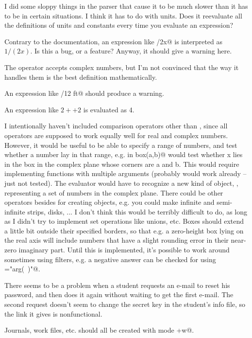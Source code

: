 \documentclass{doc}
\begin{document}
I did some sloppy things in the parser that cause it to be much slower
than it has to be in certain situations. I think it has to do with units.
Does it reevaluate all the definitions of units and constants every
time you evaluate an expression?

Contrary to the documentation, an expression like /2x@ is interpreted as
$1/(2x)$. Is this a bug, or a feature? Anyway, it should give a warning here.

The \verb@mod@ operator accepts complex numbers, but I'm not convinced that
the way it handles them is the best definition mathematically.

An expression like /12 ft@ should produce a warning.

An expression like $2++2$ is evaluated as 4.

I intentionally haven't included comparison operators other than \verb@eq@, since all operators are
supposed to work equally well for real and complex numbers. However, it would be useful to be able
to specify a range of numbers, and test whether a number lay in that range, e.g.
\verb@x in box(a,b)@ would test whether x lies in the box in the complex plane whose corners are a and b.
This would require implementing functions with multiple arguments (probably would work already --
just not tested). The evaluator would have to recognize a new kind of object, \verb@Set@,
representing a set of numbers in the complex plane.
There could be other operators besides \verb@box@ for creating \verb@Set@ objects, e.g. 
you could make infinite and semi-infinite strips, disks, ... I don't think this would be
terribly difficult to do, as long as I didn't try to implement set operations like unions, etc.
Boxes should extend a little bit outside
their specified borders, so that e.g. a zero-height box lying on the real axis will include numbers
that have a slight rounding error in their near-zero imaginary part. 
Until this is implemented, it's possible to work around sometimes using
filters, e.g. a negative answer can be checked for using \verb@filter="arg(~)"@.

There seems to be a problem when a student requests an e-mail to reset his password,
and then does it again without waiting to get the first e-mail. The second request
doesn't seem to change the secret key in the student's info file, so the link it
gives is nonfunctional.

Journals, work files, etc. should all be created with mode \verb@g+w@.
\end{document}
